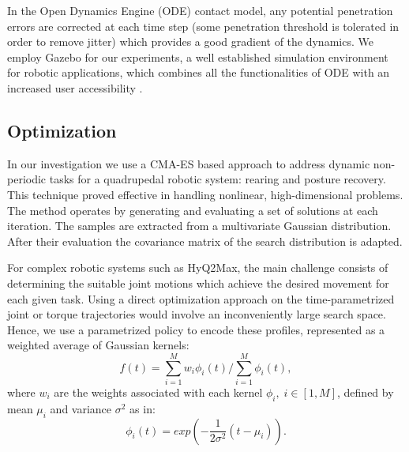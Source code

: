 \documentclass[usletter, 10pt, conference]{ieeeconf}      %
\begin{document}

In the Open Dynamics Engine (ODE) \cite{smith2002open} contact model, any 
potential penetration errors are corrected at each time step (some penetration 
threshold is tolerated in order to remove jitter) which provides a good gradient 
of the dynamics. We employ Gazebo for our experiments, 
a well established simulation environment for robotic applications, which combines all the
functionalities of ODE with an increased user accessibility \cite{koenig2004design}.

\subsection{Optimization}

In our investigation we use a CMA-ES based approach to address dynamic 
non-periodic tasks for a quadrupedal robotic system: rearing and posture 
recovery. This technique proved effective in handling nonlinear, high-dimensional 
problems. The method operates by generating and evaluating 
a set of solutions at each iteration. The samples are extracted from a 
multivariate Gaussian distribution. After their evaluation 
the covariance matrix of the search distribution is adapted. 

For complex robotic systems such as HyQ2Max, the main challenge consists of 
determining the suitable joint motions which achieve the desired movement for 
each given task. Using a direct optimization approach on the time-parametrized joint or torque trajectories would involve an inconveniently large search 
space. Hence, we use a parametrized policy to encode these profiles, represented as 
a weighted average of Gaussian kernels: 
\begin{equation}
 \label{weighted_sum}
 f(t) = \sum_{i=1}^{M} w_i \phi_i(t)/ \sum_{i=1}^{M} \phi_i(t),
 \end{equation}
\noindent
where $w_i$ are the weights associated with each kernel $\phi_i, \; i \in [1, M]$, defined by mean $\mu_i$ and 
variance $\sigma^2$ as in:
\begin{equation}
 \phi_i(t) = exp(- \frac{1}{2 \sigma^2} (t-\mu_i)).
 \label{gaus_kernels}
\end{equation}
\end{document}
